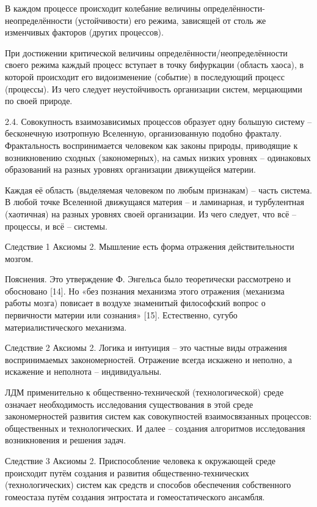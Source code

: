 \documentclass[11pt,a4paper]{article}
\begin{document}
В каждом процессе происходит колебание величины определённости-неопределённости (устойчивости) его режима, зависящей от столь же изменчивых факторов (других процессов).

При достижении критической величины определённости/неопределённости своего режима каждый процесс вступает в точку бифуркации (область хаоса), в которой происходит его видоизменение (событие) в последующий процесс (процессы). Из чего следует неустойчивость организации систем, мерцающими по своей природе.

2.4. Совокупность взаимозависимых процессов образует одну большую систему – бесконечную изотропную Вселенную, организованную подобно фракталу. Фрактальность воспринимается человеком как законы природы, приводящие к возникновению сходных (закономерных), на самых низких уровнях – одинаковых образований на разных уровнях организации движущейся материи.

Каждая её область (выделяемая человеком по любым признакам) – часть система. В любой точке Вселенной движущаяся материя – и ламинарная, и турбулентная (хаотичная) на разных уровнях своей организации. Из чего следует, что всё – процессы, и всё – системы.

 

Следствие 1 Аксиомы 2. Мышление есть форма от­ра­же­ния действительности мозгом.

Пояснения. Это утверждение Ф. Энгельса было теоретически рассмотрено и обосновано [14]. Но «без познания механизма этого отражения (механизма работы мозга) повисает в воздухе знаменитый философский вопрос о первичности материи или сознания» [15]. Естественно, сугубо материалистического механизма.

 

Следствие 2 Аксиомы 2. Логика и интуиция – это частные виды отражения воспринимаемых закономерностей. Отражение всегда искажено и неполно, а искажение и неполнота – индивидуальны.

ЛДМ применительно к общественно-технической (технологической) среде означает необходимость исследования существования в этой среде закономерностей развития систем как совокупностей взаимосвязанных процессов: общественных и технологических. И далее – создания алгоритмов исследования возникновения и решения задач.

 

Следствие 3 Аксиомы 2. Приспособление человека к окружающей среде происходит путём создания и развития общественно-технических (технологических) систем как средств и способов обеспечения собственного гомеостаза путём создания энтростата и гомеостатического ансамбля.
\end{document}
